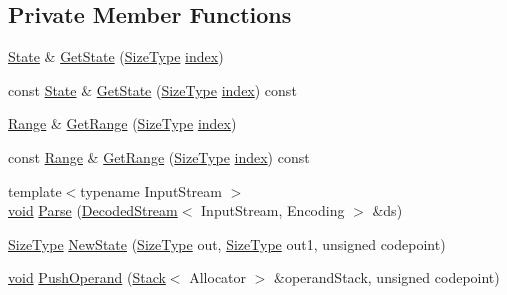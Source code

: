 \subsection*{Private Member Functions}
\begin{DoxyCompactItemize}
\item 
\hyperlink{structinternal_1_1GenericRegex_1_1State}{State} \& \hyperlink{classinternal_1_1GenericRegex_a25b5411bf4c332cba932006712d50ab7}{Get\+State} (\hyperlink{rapidjson_8h_a5ed6e6e67250fadbd041127e6386dcb5}{Size\+Type} \hyperlink{imgui__impl__opengl3__loader_8h_a57f14e05b1900f16a2da82ade47d0c6d}{index})
\item 
const \hyperlink{structinternal_1_1GenericRegex_1_1State}{State} \& \hyperlink{classinternal_1_1GenericRegex_a5c489eebc2f2fa12866029de0a3f0a01}{Get\+State} (\hyperlink{rapidjson_8h_a5ed6e6e67250fadbd041127e6386dcb5}{Size\+Type} \hyperlink{imgui__impl__opengl3__loader_8h_a57f14e05b1900f16a2da82ade47d0c6d}{index}) const
\item 
\hyperlink{structinternal_1_1GenericRegex_1_1Range}{Range} \& \hyperlink{classinternal_1_1GenericRegex_aa81705b924ba862a7b26177a9eabb2af}{Get\+Range} (\hyperlink{rapidjson_8h_a5ed6e6e67250fadbd041127e6386dcb5}{Size\+Type} \hyperlink{imgui__impl__opengl3__loader_8h_a57f14e05b1900f16a2da82ade47d0c6d}{index})
\item 
const \hyperlink{structinternal_1_1GenericRegex_1_1Range}{Range} \& \hyperlink{classinternal_1_1GenericRegex_ae79baed3a6003bd2f4e682f2f07df8a9}{Get\+Range} (\hyperlink{rapidjson_8h_a5ed6e6e67250fadbd041127e6386dcb5}{Size\+Type} \hyperlink{imgui__impl__opengl3__loader_8h_a57f14e05b1900f16a2da82ade47d0c6d}{index}) const
\item 
{\footnotesize template$<$typename Input\+Stream $>$ }\\\hyperlink{imgui__impl__opengl3__loader_8h_ac668e7cffd9e2e9cfee428b9b2f34fa7}{void} \hyperlink{classinternal_1_1GenericRegex_a038af33f370a14f987fb79d78f0d1c75}{Parse} (\hyperlink{classinternal_1_1DecodedStream}{Decoded\+Stream}$<$ Input\+Stream, Encoding $>$ \&ds)
\item 
\hyperlink{rapidjson_8h_a5ed6e6e67250fadbd041127e6386dcb5}{Size\+Type} \hyperlink{classinternal_1_1GenericRegex_ad57a48991e61750ef7426c48b1d3e51b}{New\+State} (\hyperlink{rapidjson_8h_a5ed6e6e67250fadbd041127e6386dcb5}{Size\+Type} out, \hyperlink{rapidjson_8h_a5ed6e6e67250fadbd041127e6386dcb5}{Size\+Type} out1, unsigned codepoint)
\item 
\hyperlink{imgui__impl__opengl3__loader_8h_ac668e7cffd9e2e9cfee428b9b2f34fa7}{void} \hyperlink{classinternal_1_1GenericRegex_a1a3ea65f584e0dba5815a1232f9a770e}{Push\+Operand} (\hyperlink{classinternal_1_1Stack}{Stack}$<$ Allocator $>$ \&operand\+Stack, unsigned codepoint)

\end{DoxyCompactItemize}
